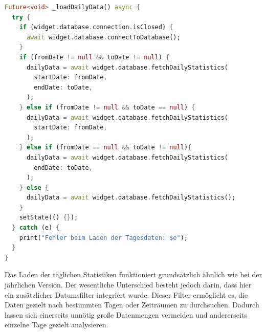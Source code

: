 \documentclass{article}
\begin{document}
    \begin{lstlisting}[language=Dart]
Future<void> _loadDailyData() async {
  try {
    if (widget.database.connection.isClosed) {
      await widget.database.connectToDatabase();
    }
    if (fromDate != null && toDate != null) {
      dailyData = await widget.database.fetchDailyStatistics(
        startDate: fromDate,
        endDate: toDate,
      );
    } else if (fromDate != null && toDate == null) {
      dailyData = await widget.database.fetchDailyStatistics(
        startDate: fromDate,
      );
    } else if (fromDate == null && toDate != null){
      dailyData = await widget.database.fetchDailyStatistics(
        endDate: toDate,
      );
    } else {
      dailyData = await widget.database.fetchDailyStatistics();
    }
    setState(() {});
  } catch (e) {
    print("Fehler beim Laden der Tagesdaten: $e");
  }
}
    \end{lstlisting}
    Das Laden der täglichen Statistiken funktioniert grundsätzlich ähnlich wie bei der jährlichen Version.
    Der wesentliche Unterschied besteht jedoch darin, dass hier ein zusätzlicher Datumsfilter integriert wurde.
    Dieser Filter ermöglicht es, die Daten gezielt nach bestimmten Tagen oder Zeiträumen zu durchsuchen.
    Dadurch lassen sich einerseits unnötig große Datenmengen vermeiden und andererseits einzelne Tage gezielt analysieren.
\end{document}
